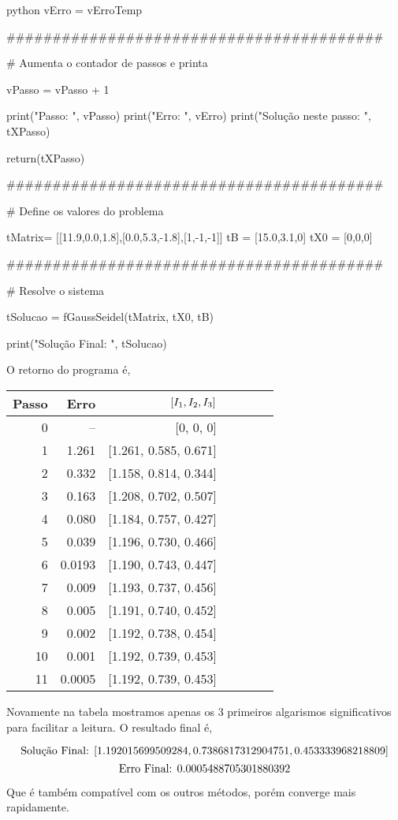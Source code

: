 \documentclass[twoside]{amsart}
\numberwithin{equation}{section}
\begin{document}
\begin{mintedbox}{python}
                vErro = vErroTemp

    #########################################

    # Aumenta o contador de passos e printa
    
        vPasso = vPasso + 1

        print("Passo: ", vPasso)
        print("Erro: ", vErro)
        print("Solução neste passo: ", tXPasso)

    return(tXPasso)

    #########################################

    # Define os valores do problema

tMatrix= [[11.9,0.0,1.8],[0.0,5.3,-1.8],[1,-1,-1]]
tB = [15.0,3.1,0]
tX0 = [0,0,0]

    #########################################

    # Resolve o sistema

tSolucao = fGaussSeidel(tMatrix, tX0, tB)

print("Solução Final: ", tSolucao)
\end{mintedbox}

O retorno do programa é,

\centering
{
    \begin{tabular}{rrrrrrr}
        \hline
           Passo  &  Erro &   $\qty[I_1,I_2,I_3]$ \\
        \hline
        0
        & --
        &  [0, 0, 0]\\
          1
        &  1.261
        &  [1.261, 0.585, 0.671]\\
          2
        &  0.332
        &  [1.158, 0.814, 0.344]\\
          3
        &  0.163
        &  [1.208, 0.702, 0.507]\\
          4
        &  0.080
        &  [1.184, 0.757, 0.427]\\
          5
        &  0.039
        &  [1.196, 0.730, 0.466]\\
          6
        &  0.0193
        &  [1.190, 0.743, 0.447]\\
          7
        &  0.009
        &  [1.193, 0.737, 0.456]\\
          8
        &  0.005
        &  [1.191, 0.740, 0.452]\\
          9
        &  0.002
        &  [1.192, 0.738, 0.454]\\
          10
        &  0.001
        &  [1.192, 0.739, 0.453]\\
          11
        &  0.0005
        &  [1.192, 0.739, 0.453]\\
        \hline
        \end{tabular}
}

\justifying

Novamente na tabela mostramos apenas os 3 primeiros algarismos significativos para facilitar a 
leitura. O resultado final é,

$$\textnormal{Solução Final:   }  [1.192015699509284, 0.7386817312904751, 0.453333968218809]$$
$$\textnormal{Erro Final:   } 0.0005488705301880392$$

Que é também compatível com os outros métodos, porém converge mais rapidamente.
\end{document}
